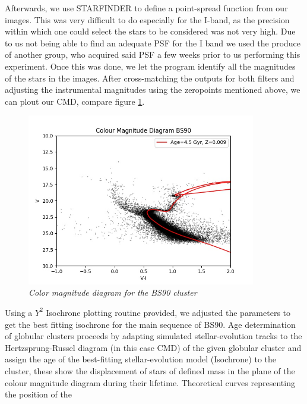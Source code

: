 Afterwards, we use STARFINDER to define a point-spread function from our images. This was very difficult to do especially for the I-band, as the precision within which one could select the stars to be considered was not very high. Due to us not being able to find an adequate PSF for the I band we used the produce of another group, who acquired said PSF a few weeks prior to us performing this experiment. Once this was done, we let the program identify all the magnitudes of the stars in the images. After cross-matching the outputs for both filters and adjusting the instrumental magnitudes using the zeropoints mentioned above, we can plout our CMD, compare figure \ref{fig:Abbildung 11}.
\begin{figure}[h]
	\includegraphics[width=100mm]{CMD}
	\centering
	\caption{ \itshape Color magnitude diagram for the BS90 cluster}
	\label{fig:Abbildung 11}
\end{figure}
\noindent
Using a $Y^{2}$ Isochrone plotting routine provided, we adjusted the parameters to get the best fitting isochrone for the main sequence of BS90. Age determination of globular clusters proceeds by adapting simulated stellar-evolution tracks to the Hertzsprung-Russel diagram (in this case CMD) of the given globular cluster and assign the age of the best-fitting stellar-evolution model (Isochrone) to the cluster, these show the displacement of stars of defined mass in the plane of the colour magnitude
diagram during their lifetime. Theoretical curves representing the position of the
